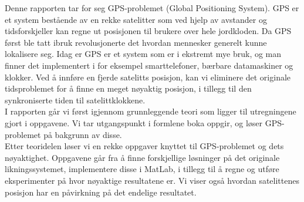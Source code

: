 
Denne rapporten tar for seg GPS-problemet (Global Positioning System). GPS er et system bestående av en rekke satelitter som ved hjelp av avstander og tidsforskjeller kan regne ut posisjonen til brukere over hele jordkloden. Da GPS først ble tatt ibruk revolusjonerte det hvordan mennesker generelt kunne lokalisere seg. Idag er GPS er et system som er i ekstremt mye bruk, og man finner det implementert i for eksempel smarttelefoner, bærbare datamaskiner og klokker. Ved å innføre en fjerde satelitts posisjon, kan vi eliminere det originale tidsproblemet for å finne en meget nøyaktig posisjon, i tillegg til den synkroniserte tiden til satelittklokkene. \\

I rapporten går vi først igjennom grunnleggende teori som ligger til utregningene gjort i oppgavene. Vi tar utgangspunkt i formlene boka oppgir, og løser GPS-problemet på bakgrunn av disse. \\

Etter teoridelen løser vi en rekke oppgaver knyttet til GPS-problemet og dets nøyaktighet. Oppgavene går fra å finne forskjellige løsninger på det originale likningssystemet, implementere disse i MatLab, i tillegg til å regne og utføre eksperimenter på hvor nøyaktige resultatene er. Vi viser også hvordan satelittenes posisjon har en påvirkning på det endelige resultatet. 